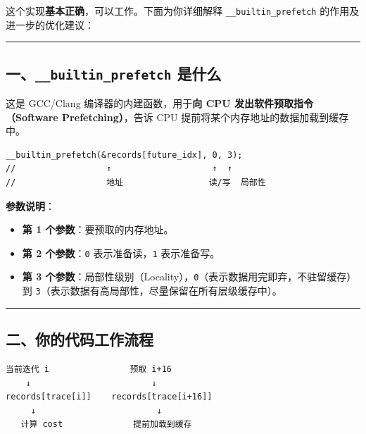 \documentclass[11pt, a4paper]{article}
\begin{document}
\begin{aibox}
这个实现\textbf{基本正确}，可以工作。下面为你详细解释 \texttt{\_\_builtin\_prefetch} 的作用及进一步的优化建议：

\begin{center}\rule{\textwidth}{0.4pt}\end{center}

\subsection*{一、\texttt{\_\_builtin\_prefetch} 是什么}

这是 GCC/Clang 编译器的内建函数，用于\textbf{向 CPU 发出软件预取指令（Software Prefetching）}，告诉 CPU 提前将某个内存地址的数据加载到缓存中。

\begin{tcolorbox}[colback=white,colframe=gray!50!white,boxrule=0.5pt,arc=2pt,left=5pt,right=5pt,top=5pt,bottom=5pt]
\begin{verbatim}
__builtin_prefetch(&records[future_idx], 0, 3);
//                  ↑                    ↑  ↑
//                  地址                 读/写  局部性
\end{verbatim}
\end{tcolorbox}

\textbf{参数说明}：
\begin{itemize}
    \item \textbf{第 1 个参数}：要预取的内存地址。
    \item \textbf{第 2 个参数}：\texttt{0} 表示准备读，\texttt{1} 表示准备写。
    \item \textbf{第 3 个参数}：局部性级别（Locality），\texttt{0}（表示数据用完即弃，不驻留缓存）到 \texttt{3}（表示数据有高局部性，尽量保留在所有层级缓存中）。
\end{itemize}

\begin{center}\rule{\textwidth}{0.4pt}\end{center}

\subsection*{二、你的代码工作流程}

\begin{tcolorbox}[colback=white,colframe=gray!50!white,boxrule=0.5pt,arc=2pt,left=5pt,right=5pt,top=5pt,bottom=5pt]
\begin{verbatim}
当前迭代 i                预取 i+16
    ↓                        ↓
records[trace[i]]    records[trace[i+16]]
     ↓                        ↓
   计算 cost              提前加载到缓存
\end{verbatim}
\end{tcolorbox}


\end{aibox}
\end{document}
